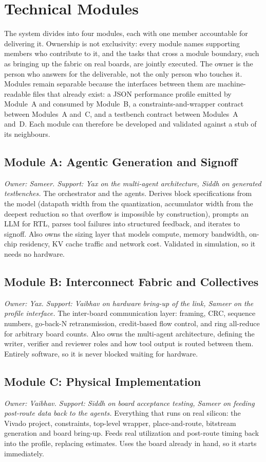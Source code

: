\documentclass[conference,10pt]{IEEEtran}
\begin{document}
\section{Technical Modules}\label{sec:modules}
The system divides into four modules, each with one member accountable for
delivering it. Ownership is not exclusivity: every module names supporting members
who contribute to it, and the tasks that cross a module boundary, such as bringing
up the fabric on real boards, are jointly executed. The owner is the person who
answers for the deliverable, not the only person who touches it. Modules remain
separable because the interfaces between them are machine-readable files that
already exist: a JSON performance profile emitted by Module~A and consumed by
Module~B, a constraints-and-wrapper contract between Modules~A and~C, and a
testbench contract between Modules~A and~D. Each module can therefore be developed
and validated against a stub of its neighbours.

\subsection{Module A: Agentic Generation and Signoff}
\emph{Owner: Sameer. Support: Yax on the multi-agent architecture, Siddh on generated testbenches.}
The orchestrator and the agents. Derives block specifications from the model
(datapath width from the quantization, accumulator width from the deepest
reduction so that overflow is impossible by construction), prompts an LLM for RTL,
parses tool failures into structured feedback, and iterates to signoff. Also owns
the sizing layer that models compute, memory bandwidth, on-chip residency, KV cache
traffic and network cost. Validated in simulation, so it needs no hardware.

\subsection{Module B: Interconnect Fabric and Collectives}
\emph{Owner: Yax. Support: Vaibhav on hardware bring-up of the link, Sameer on the profile interface.}
The inter-board communication layer: framing, CRC, sequence numbers, go-back-N
retransmission, credit-based flow control, and ring all-reduce for arbitrary board
counts. Also owns the multi-agent architecture, defining the writer, verifier and
reviewer roles and how tool output is routed between them. Entirely software, so
it is never blocked waiting for hardware.

\subsection{Module C: Physical Implementation}
\emph{Owner: Vaibhav. Support: Siddh on board acceptance testing, Sameer on feeding post-route data back to the agents.}
Everything that runs on real silicon: the Vivado project, constraints, top-level
wrapper, place-and-route, bitstream generation and board bring-up. Feeds real
utilization and post-route timing back into the profile, replacing estimates. Uses
the board already in hand, so it starts immediately.
\end{document}
